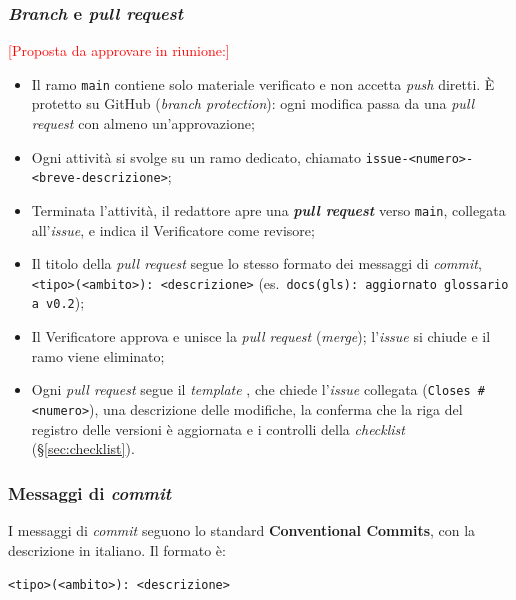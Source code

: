 \documentclass[12pt,a4paper]{article}
\newcommand{\ph}[1]{\textcolor{red}{[#1]}}
\newcommand{\tightlist}{\setlength{\itemsep}{1pt}\setlength{\parskip}{0pt}}
\begin{document}
\subsubsection{\emph{Branch} e \emph{pull request}}
\ph{Proposta da approvare in riunione:}
\begin{itemize}
\tightlist
\item Il ramo \texttt{main} contiene solo materiale verificato e non accetta \emph{push} diretti. È protetto su GitHub (\emph{branch protection}): ogni modifica passa da una \emph{pull request} con almeno un'approvazione;
\item Ogni attività si svolge su un ramo dedicato, chiamato \texttt{issue-<numero>-<breve-descrizione>};
\item Terminata l'attività, il redattore apre una \textbf{\emph{pull request}} verso \texttt{main}, collegata all'\emph{issue}, e indica il Verificatore come revisore;
\item Il titolo della \emph{pull request} segue lo stesso formato dei messaggi di \emph{commit}, \texttt{<tipo>(<ambito>): <descrizione>} (es.\ \texttt{docs(gls): aggiornato glossario a v0.2});
\item Il Verificatore approva e unisce la \emph{pull request} (\emph{merge}); l'\emph{issue} si chiude e il ramo viene eliminato;
\item Ogni \emph{pull request} segue il \emph{template} , che chiede l'\emph{issue} collegata (\texttt{Closes \#<numero>}), una descrizione delle modifiche, la conferma che la riga del registro delle versioni è aggiornata e i controlli della \emph{checklist} (§\ref{sec:checklist}).
\end{itemize}

\subsubsection{Messaggi di \emph{commit}}
I messaggi di \emph{commit} seguono lo standard \textbf{Conventional Commits}, con la descrizione in italiano. Il formato è:
\begin{center}\texttt{<tipo>(<ambito>): <descrizione>}\end{center}
\end{document}
